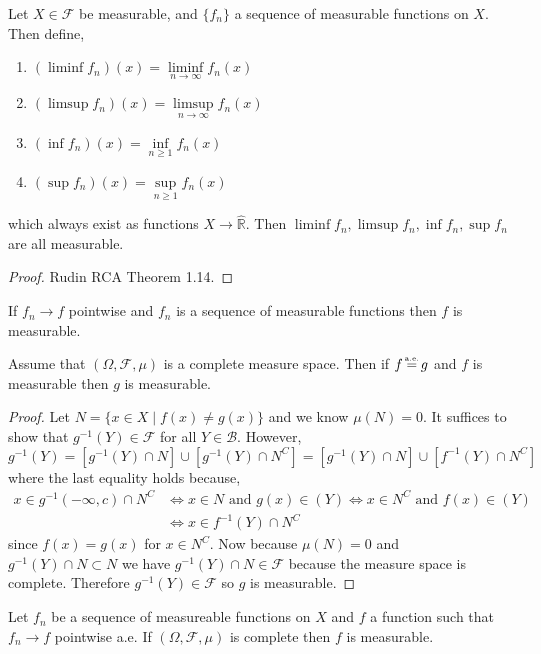 \documentclass[12pt]{article}
\newcommand{\R}{\mathbb{R}}
\newcommand\eqae{\mathrel{\stackrel{\makebox[0pt]{\mbox{\normalfont\tiny a.e.}}}{=}}}
\renewcommand{\F}{\mathcal{F}}
\begin{document}
\begin{lemma}
Let $X \in \F$ be measurable, and $\{ f_n \}$ a sequence of measurable functions on $X$. Then define,
\begin{enumerate}
\item $(\liminf f_n)(x) = \liminf\limits_{n \to \infty} f_n(x)$
\item $(\limsup f_n)(x) = \limsup\limits_{n \to \infty} f_n(x)$
\item $(\inf f_n)(x) = \inf\limits_{n \ge 1} f_n(x)$
\item $(\sup f_n)(x) = \sup\limits_{n \ge 1} f_n(x)$
\end{enumerate}
which always exist as functions $X \to \hat{\R}$. Then $\liminf f_n, \limsup f_n, \inf f_n, \sup f_n$ are all measurable.
\end{lemma}

\begin{proof}
Rudin RCA Theorem 1.14.
\end{proof}

\begin{cor}
If $f_n \to f$ pointwise and $f_n$ is a sequence of measurable functions then $f$ is measurable.
\end{cor}

\begin{lemma}
Assume that $(\Omega, \F, \mu)$ is a complete measure space. Then if $f \eqae g$ and $f$ is measurable then $g$ is measurable.
\end{lemma}

\begin{proof}
Let $N = \{ x \in X \mid f(x) \neq g(x) \}$ and we know $\mu(N) = 0$. It suffices to show that $g^{-1}(Y) \in \F$ for all $Y \in \mathcal{B}$. However,
\[ g^{-1}(Y) = [ g^{-1}(Y) \cap N ] \cup [g^{-1}(Y) \cap N^C] = [ g^{-1}(Y) \cap N ] \cup [f^{-1}(Y) \cap N^C ] \]
where the last equality holds because,
\begin{align*}
x \in g^{-1}(-\infty, c) \cap N^C & \iff x \in N \text{ and } g(x) \in (Y) \iff x \in N^C \text{ and } f(x) \in (Y)
\\
& \iff x \in f^{-1}(Y) \cap N^C 
\end{align*}
since $f(x) = g(x)$ for $x \in N^C$. Now because $\mu(N) = 0$ and $g^{-1}(Y) \cap N \subset N$ we have $g^{-1}(Y) \cap N \in \F$ because the measure space is complete. Therefore $g^{-1}(Y) \in \F$ so $g$ is measurable.
\end{proof}

\begin{cor}
Let $f_n$ be a sequence of measureable functions on $X$ and $f$ a function such that $f_n \to f$ pointwise a.e. If $(\Omega, \F, \mu)$ is complete then $f$ is measurable.
\end{cor}
\end{document}
